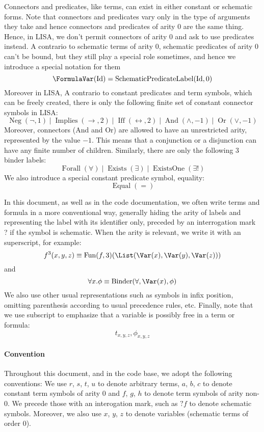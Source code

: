 \begin{defin}[Formulas]
Connectors and predicates, like terms, can exist in either constant or schematic forms. Note that connectors and predicates vary only in the type of arguments they take and hence connectors and predicates of arity 0 are the same thing. Hence, in LISA, we don't permit connectors of arity 0 and ask to use predicates instead.
A contrario to schematic terms of arity 0, schematic predicates of arity 0 can't be bound, but they still play a special role sometimes, and hence we introduce a special notation for them
$$
\FormulaVar(\textnormal{Id}) = \operatorname{SchematicPredicateLabel}(\textnormal{Id}, 0)
$$
Moreover in LISA, A contrario to constant predicates and term symbols, which can be freely created, there is only the following finite set of constant connector symbols in LISA:
$$
\operatorname{Neg}(\neg, 1)\mid \operatorname{Implies}(\rightarrow, 2)\mid \operatorname{Iff}(\leftrightarrow, 2)\mid \operatorname{And}(\land, -1)\mid \operatorname{Or}(\lor, -1)
$$
Moreover, connectors (And and Or) are allowed to have an unrestricted arity, represented by the value $-1$. This means that a conjunction or a disjunction can have any finite number of children. 
Similarly, there are only the following 3 binder labels:
$$
\operatorname{Forall}(\forall)\mid \operatorname{Exists}(\exists)\mid \operatorname{ExistsOne}(\exists !)
$$
We also introduce a special constant predicate symbol, equality:
$$
\operatorname{Equal}(=)
$$
\end{defin}

In this document, as well as in the code documentation, we often write terms and formula in a more conventional way, generally hiding the arity of labels and representing the label with its identifier only, preceded by an interrogation mark ? if the symbol is schematic. When the arity is relevant, we write it with an superscript, for example:
$$
f^3(x,y,z) \equiv \operatorname{Fun}(f, 3)(\List(\Var(x), \Var(y), \Var(z)))
$$
and
$$
\forall x. \phi \equiv \operatorname{Binder}(\forall, \Var(x), \phi)
$$
We also use other usual representations such as symbols in infix position, omitting parenthesis according to usual precedence rules, etc.
Finally, note that we use subscript to emphasize that a variable is possibly free in a term or formula:
$$
t_{x,y,z}, \phi_{x,y,z}
$$

\paragraph{Convention} Throughout this document, and in the code base, we adopt the following conventions: We use $r$, $s$, $t$, $u$ to denote arbitrary terms, $a$, $b$, $c$ to denote constant term symbols of arity $0$ and $f$, $g$, $h$ to denote term symbols of arity non-$0$. We precede those with an interogation mark, such as $?f$ to denote schematic symbols. Moreover, we also use $x$, $y$, $z$ to denote variables (schematic terms of order $0$).

